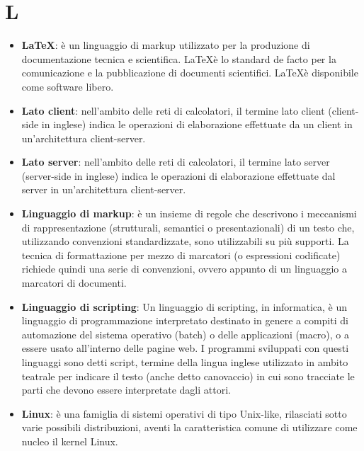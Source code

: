 \section{L}
\begin{itemize} 
	\item
	\textbf{\LaTeX}: è un linguaggio di markup utilizzato per la produzione di documentazione tecnica e scientifica. \LaTeX è lo standard de facto per la comunicazione e la pubblicazione di documenti scientifici. \LaTeX è disponibile come software libero.
	\item
	\textbf{Lato client}: nell'ambito delle reti di calcolatori, il termine lato client (client-side in inglese) indica le operazioni di elaborazione effettuate da un client in un'architettura client-server.
	\item
	\textbf{Lato server}: nell'ambito delle reti di calcolatori, il termine lato server (server-side in inglese) indica le operazioni di elaborazione effettuate dal server in un'architettura client-server.
	\item
	\textbf{Linguaggio di markup}: è un insieme di regole che descrivono i meccanismi di rappresentazione (strutturali, semantici o presentazionali) di un testo che, utilizzando convenzioni standardizzate, sono utilizzabili su più supporti. La tecnica di formattazione per mezzo di marcatori (o espressioni codificate) richiede quindi una serie di convenzioni, ovvero appunto di un linguaggio a marcatori di documenti.
	\item
	\textbf{Linguaggio di scripting}: Un linguaggio di scripting, in informatica, è un linguaggio di programmazione interpretato destinato in genere a compiti di automazione del sistema operativo (batch) o delle applicazioni (macro), o a essere usato all'interno delle pagine web.
	I programmi sviluppati con questi linguaggi sono detti script, termine della lingua inglese utilizzato in ambito teatrale per indicare il testo (anche detto canovaccio) in cui sono tracciate le parti che devono essere interpretate dagli attori.
	\item
	\textbf{Linux}: è una famiglia di sistemi operativi di tipo Unix-like, rilasciati sotto varie possibili distribuzioni, aventi la caratteristica comune di utilizzare come nucleo il kernel Linux.
\end{itemize}